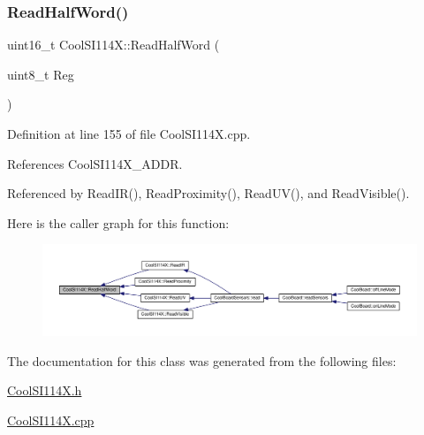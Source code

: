 \subsubsection{\texorpdfstring{Read\+Half\+Word()}{ReadHalfWord()}}
{\footnotesize\ttfamily uint16\+\_\+t Cool\+S\+I114\+X\+::\+Read\+Half\+Word (\begin{DoxyParamCaption}\item[{uint8\+\_\+t}]{Reg }\end{DoxyParamCaption})\hspace{0.3cm}{\ttfamily [private]}}



Definition at line 155 of file Cool\+S\+I114\+X.\+cpp.



References Cool\+S\+I114\+X\+\_\+\+A\+D\+DR.



Referenced by Read\+I\+R(), Read\+Proximity(), Read\+U\+V(), and Read\+Visible().

Here is the caller graph for this function\+:
\nopagebreak
\begin{figure}[H]
\begin{center}
\leavevmode
\includegraphics[width=350pt]{dd/d67/class_cool_s_i114_x_a1d25c9e137874af529804c2ec796a6b9_icgraph}
\end{center}
\end{figure}


The documentation for this class was generated from the following files\+:\begin{DoxyCompactItemize}
\item 
\hyperlink{_cool_s_i114_x_8h}{Cool\+S\+I114\+X.\+h}\item 
\hyperlink{_cool_s_i114_x_8cpp}{Cool\+S\+I114\+X.\+cpp}\end{DoxyCompactItemize}
